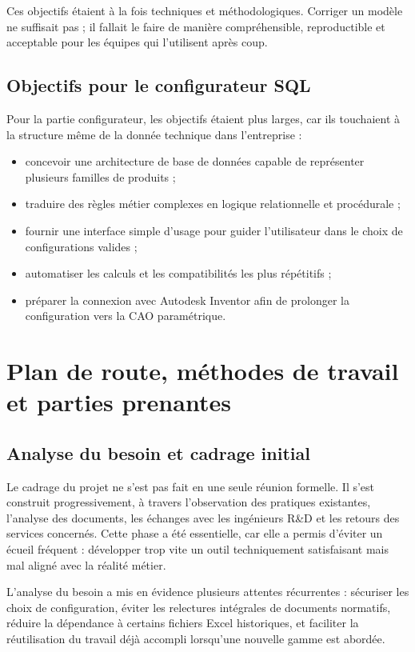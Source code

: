 Ces objectifs étaient à la fois techniques et méthodologiques. Corriger un modèle ne suffisait pas ; il fallait le faire de manière compréhensible, reproductible et acceptable pour les équipes qui l'utilisent après coup.

\subsection{Objectifs pour le configurateur SQL}

Pour la partie configurateur, les objectifs étaient plus larges, car ils touchaient à la structure même de la donnée technique dans l'entreprise :

\begin{itemize}[leftmargin=1.4cm]
\item concevoir une architecture de base de données capable de représenter plusieurs familles de produits ;
\item traduire des règles métier complexes en logique relationnelle et procédurale ;
\item fournir une interface simple d'usage pour guider l'utilisateur dans le choix de configurations valides ;
\item automatiser les calculs et les compatibilités les plus répétitifs ;
\item préparer la connexion avec Autodesk Inventor afin de prolonger la configuration vers la CAO paramétrique.
\end{itemize}

\section{Plan de route, méthodes de travail et parties prenantes}

\subsection{Analyse du besoin et cadrage initial}

Le cadrage du projet ne s'est pas fait en une seule réunion formelle. Il s'est construit progressivement, à travers l'observation des pratiques existantes, l'analyse des documents, les échanges avec les ingénieurs R\&D et les retours des services concernés. Cette phase a été essentielle, car elle a permis d'éviter un écueil fréquent : développer trop vite un outil techniquement satisfaisant mais mal aligné avec la réalité métier.

L'analyse du besoin a mis en évidence plusieurs attentes récurrentes : sécuriser les choix de configuration, éviter les relectures intégrales de documents normatifs, réduire la dépendance à certains fichiers Excel historiques, et faciliter la réutilisation du travail déjà accompli lorsqu'une nouvelle gamme est abordée.


